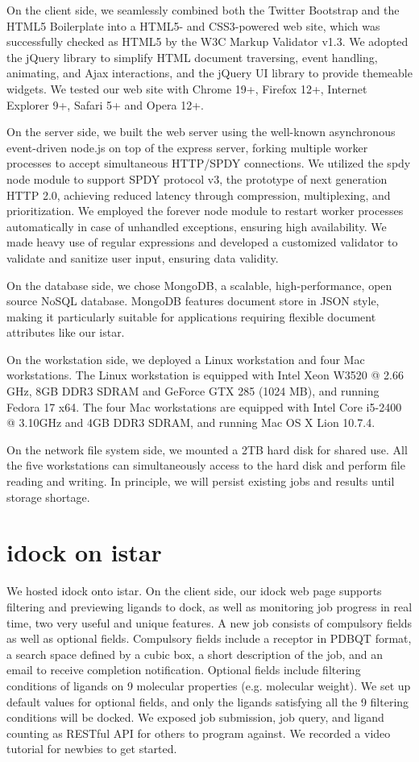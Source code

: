 \documentclass{bioinfo}
\begin{document}
On the client side, we seamlessly combined both the Twitter Bootstrap and the HTML5 Boilerplate into a HTML5- and CSS3-powered web site, which was successfully checked as HTML5 by the W3C Markup Validator v1.3. We adopted the jQuery library to simplify HTML document traversing, event handling, animating, and Ajax interactions, and the jQuery UI library to provide themeable widgets. We tested our web site with Chrome 19+, Firefox 12+, Internet Explorer 9+, Safari 5+ and Opera 12+.

On the server side, we built the web server using the well-known asynchronous event-driven node.js on top of the express server, forking multiple worker processes to accept simultaneous HTTP/SPDY connections. We utilized the spdy node module to support SPDY protocol v3, the prototype of next generation HTTP 2.0, achieving reduced latency through compression, multiplexing, and prioritization. We employed the forever node module to restart worker processes automatically in case of unhandled exceptions, ensuring high availability. We made heavy use of regular expressions and developed a customized validator to validate and sanitize user input, ensuring data validity.

On the database side, we chose MongoDB, a scalable, high-performance, open source NoSQL database. MongoDB features document store in JSON style, making it particularly suitable for applications requiring flexible document attributes like our istar.

On the workstation side, we deployed a Linux workstation and four Mac workstations. The Linux workstation is equipped with Intel Xeon W3520 @ 2.66 GHz, 8GB DDR3 SDRAM and GeForce GTX 285 (1024 MB), and running Fedora 17 x64. The four Mac workstations are equipped with Intel Core i5-2400 @ 3.10GHz and 4GB DDR3 SDRAM, and running Mac OS X Lion 10.7.4.

On the network file system side, we mounted a 2TB hard disk for shared use. All the five workstations can simultaneously access to the hard disk and perform file reading and writing. In principle, we will persist existing jobs and results until storage shortage.

\section{idock on istar}

We hosted idock onto istar. On the client side, our idock web page supports filtering and previewing ligands to dock, as well as monitoring job progress in real time, two very useful and unique features. A new job consists of compulsory fields as well as optional fields. Compulsory fields include a receptor in PDBQT format, a search space defined by a cubic box, a short description of the job, and an email to receive completion notification. Optional fields include filtering conditions of ligands on 9 molecular properties (e.g. molecular weight). We set up default values for optional fields, and only the ligands satisfying all the 9 filtering conditions will be docked. We exposed job submission, job query, and ligand counting as RESTful API for others to program against. We recorded a video tutorial for newbies to get started.
\end{document}
